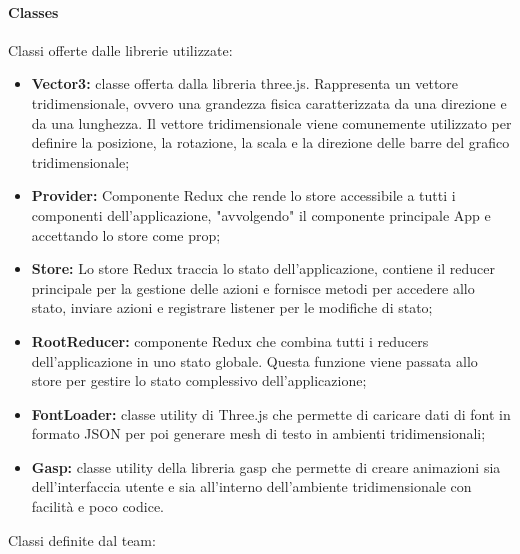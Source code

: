 \paragraph{Classes}
    Classi offerte dalle librerie utilizzate:
    \begin{itemize}
        \item \textbf{Vector3:} classe offerta dalla libreria three.js. Rappresenta un vettore tridimensionale, ovvero
        una grandezza fisica caratterizzata da una direzione e da una lunghezza. Il vettore tridimensionale
        viene comunemente utilizzato per definire la posizione, la rotazione, la scala e la direzione
        delle barre del grafico tridimensionale;
        \item \textbf{Provider:} Componente Redux che rende lo store accessibile a tutti i componenti dell'applicazione, "avvolgendo" il componente principale App e accettando lo store come prop;
        \item \textbf{Store:} Lo store Redux traccia lo stato dell'applicazione, contiene il reducer principale per la gestione delle azioni e fornisce metodi per accedere allo stato,
        inviare azioni e registrare listener per le modifiche di stato;
        \item \textbf{RootReducer:} componente Redux che combina tutti i reducers dell’applicazione in uno stato
        globale. Questa funzione viene passata allo store per gestire lo stato complessivo dell’applicazione;
        \item \textbf{FontLoader:} classe utility di Three.js che permette di caricare dati di font in formato JSON per poi generare mesh di testo in ambienti tridimensionali;
        \item \textbf{Gasp:} classe utility della libreria gasp che permette di creare animazioni sia dell'interfaccia utente e sia all'interno dell'ambiente tridimensionale con facilità e poco codice.
    \end{itemize}
    Classi definite dal team:
